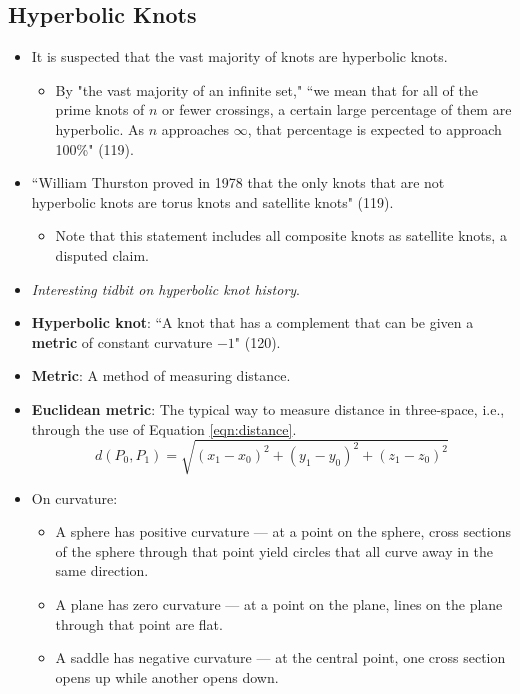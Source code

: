 \documentclass[titlepage]{article}
\numberwithin{figure}{section}
\numberwithin{table}{section}
\numberwithin{equation}{section}
\newcommand{\dq}[2]{``#1" (#2).}
\begin{document}
\subsection{Hyperbolic Knots}\label{sss:Hyperbolic}
\begin{itemize}
    \item It is suspected that the vast majority of knots are hyperbolic knots.
    \begin{itemize}
        \item By "the vast majority of an infinite set," \dq{we mean that for all of the prime knots of $n$ or fewer crossings, a certain large percentage of them are hyperbolic. As $n$ approaches $\infty$, that percentage is expected to approach 100\%}{119}
    \end{itemize}
    \item \dq{William Thurston proved in 1978 that the only knots that are not hyperbolic knots are torus knots and satellite knots}{119}
    \begin{itemize}
        \item Note that this statement includes all composite knots as satellite knots, a disputed claim.
    \end{itemize}
    \item \emph{Interesting tidbit on hyperbolic knot history}.
    \item \textbf{Hyperbolic knot}: \dq{A knot that has a complement that can be given a \textbf{metric} of constant curvature $-1$}{120}
    \item \textbf{Metric}: A method of measuring distance.
    \item \textbf{Euclidean metric}: The typical way to measure distance in three-space, i.e., through the use of Equation \ref{eqn:distance}.
    \begin{equation}\label{eqn:distance}
        d(P_0,P_1)=\sqrt{(x_1-x_0)^2+(y_1-y_0)^2+(z_1-z_0)^2}
    \end{equation}
    \item On curvature:
    \begin{itemize}
        \item A sphere has positive curvature --- at a point on the sphere, cross sections of the sphere through that point yield circles that all curve away in the same direction.
        \item A plane has zero curvature --- at a point on the plane, lines on the plane through that point are flat.
        \item A saddle has negative curvature --- at the central point, one cross section opens up while another opens down.

\end{itemize}
\end{itemize}
\end{document}
